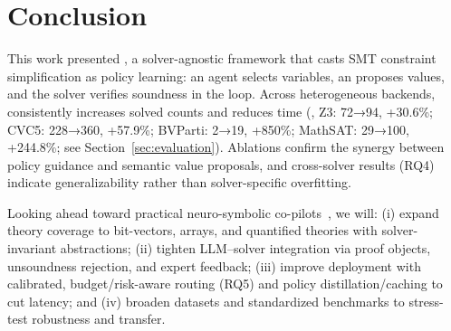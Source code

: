 \section{Conclusion}
\label{sec:conclusion}


This work presented \tool, a solver-agnostic framework that casts SMT constraint simplification as policy learning: an \RL{} agent selects variables, an \LLM{} proposes values, and the solver verifies soundness in the loop. Across heterogeneous backends, \tool consistently increases solved counts and reduces time (\eg, Z3: 72→94, +30.6\%; CVC5: 228→360, +57.9\%; BVParti: 2→19, +850\%; MathSAT: 29→100, +244.8\%; see Section~\ref{sec:evaluation}). Ablations confirm the synergy between policy guidance and semantic value proposals, and cross-solver results (RQ4) indicate generalizability rather than solver-specific overfitting.

Looking ahead toward practical neuro-symbolic co-pilots~\cite{neurosymbolic2021}, we will: (i) expand theory coverage to bit-vectors, arrays, and quantified theories with solver-invariant abstractions; (ii) tighten LLM–solver integration via proof objects, unsoundness rejection, and expert feedback; (iii) improve deployment with calibrated, budget/risk-aware routing (RQ5) and policy distillation/caching to cut latency; and (iv) broaden datasets and standardized benchmarks to stress-test robustness and transfer.

